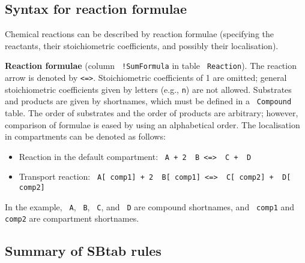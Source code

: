 \documentclass[a4paper]{article}
\newcommand{\la}[1]{}
\newcommand{\tab}[1]{{\texttt{\color{red} #1}}}
\newcommand{\col}[1]{\texttt{\color{blue} #1}}
\newcommand{\nick}[1] {\texttt{\color{lila} #1}}
\begin{document}
\subsection{Syntax for reaction \la{and regulation} formulae}
\label{chapter4}

Chemical reactions can be described by reaction formulae (specifying
the reactants, their stoichiometric coefficients, and possibly their
localisation).

\textbf{Reaction formulae} (column \col{!SumFormula} in table
  \tab{Reaction}).  The reaction arrow is denoted by \texttt{<=>}.
  Stoichiometric coefficients of 1 are omitted; general stoichiometric
  coefficients given by letters (e.g., \texttt{n}) are not allowed.
  Substrates and products are given by shortnames, which  must be defined 
  in a \tab{Compound} table.
  The order of substrates and the order of products are arbitrary;
  however, comparison of formulae is eased by using an
  alphabetical order. The localisation in compartments can be denoted as follows:

\begin{itemize}
\item Reaction in the default compartment: \texttt{\nick{A} + 2 \nick{B} <=> \nick{C} + \nick{D}}
\item Transport reaction: \texttt{\nick{A}[\nick{comp1}] + 2 \nick{B}[\nick{comp1}] <=> \nick{C}[\nick{comp2}] + \nick{D}[\nick{comp2}]}
\end{itemize}

In the example, \nick{A}, \nick{B}, \nick{C}, and \nick{D} are
compound shortnames, and \nick{comp1} and \nick{comp2} are compartment
shortnames.  


\subsection{Summary of SBtab rules}
\end{document}
